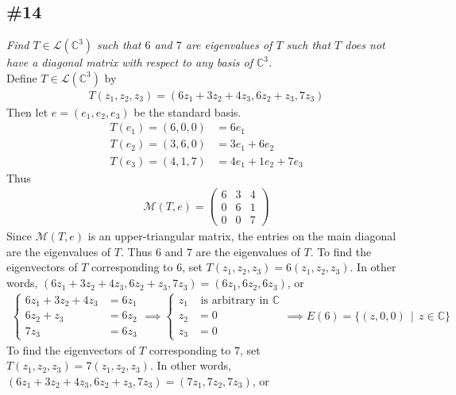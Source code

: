 \documentclass[12pt]{article}
\newcommand{\suchthat}{\, \mid \,}
\begin{document}
\subsection*{\#14}
{\it Find $T \in \mathcal{L}(\mathbb{C}^3)$ such that $6$ and $7$ are eigenvalues of $T$ such that $T$ does not have a diagonal matrix with respect to any basis of $\mathbb{C}^3$.} \\

\noindent Define $T \in \mathcal{L}(\mathbb{C}^3)$ by
\begin{align*}
	T(z_1, z_2, z_3) = (6z_1 + 3z_2 + 4z_3, 6z_2 + z_3, 7z_3)
\end{align*}
Then let $e = (e_1, e_2, e_3)$ be the standard basis.
\begin{align*}
	T(e_1) = (6, 0, 0) &= 6e_1 \\
	T(e_2) = (3, 6, 0) &= 3e_1 + 6e_2 \\
	T(e_3) = (4, 1, 7) &= 4e_1 + 1e_2 + 7e_3
\end{align*}
Thus
\begin{align*}
	\mathcal{M}(T, e) = \left(\begin{array}{ccc}
		6 & 3 & 4 \\
		0 & 6 & 1 \\
		0 & 0 & 7
	\end{array}\right)
\end{align*}
Since $\mathcal{M}(T, e)$ is an upper-triangular matrix, the entries on the main diagonal are the eigenvalues of $T$.  Thus $6$ and $7$ are the eigenvalues of $T$.  To find the eigenvectors of $T$ corresponding to $6$, set $T(z_1, z_2, z_3) = 6(z_1, z_2, z_3)$.  In other words, $(6z_1 + 3z_2 + 4z_3, 6z_2 + z_3, 7z_3) = (6z_1, 6z_2, 6z_3)$, or 
\begin{align*}
	\begin{cases}
		6z_1 + 3z_2 + 4z_3 &= 6z_1 \\
		6z_2 + z_3 &= 6z_2 \\
		7z_3 &= 6z_3
	\end{cases}
	\implies\begin{cases}
		z_1 &\text{ is arbitrary in $\mathbb{C}$} \\
		z_2 &= 0 \\
		z_3 &= 0
	\end{cases}
	\implies E(6) = \{(z, 0, 0) \suchthat z \in \mathbb{C}\}
\end{align*}
To find the eigenvectors of $T$ corresponding to $7$, set $T(z_1, z_2, z_3) = 7(z_1, z_2, z_3)$.  In other words, $(6z_1 + 3z_2 + 4z_3, 6z_2 + z_3, 7z_3) = (7z_1, 7z_2, 7z_3)$, or 
\end{document}
